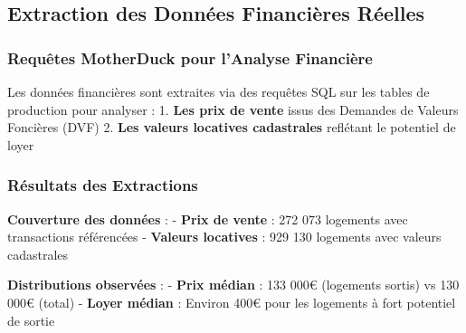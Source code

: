\documentclass[11pt]{article}
\begin{document}
    \subsection{Extraction des Données Financières
Réelles}\label{extraction-des-donnuxe9es-financiuxe8res-ruxe9elles}

\subsubsection{Requêtes MotherDuck pour l'Analyse
Financière}\label{requuxeates-motherduck-pour-lanalyse-financiuxe8re}

Les données financières sont extraites via des requêtes SQL sur les
tables de production pour analyser : 1. \textbf{Les prix de vente} issus
des Demandes de Valeurs Foncières (DVF) 2. \textbf{Les valeurs locatives
cadastrales} reflétant le potentiel de loyer

\subsubsection{Résultats des
Extractions}\label{ruxe9sultats-des-extractions}

\textbf{Couverture des données} : - \textbf{Prix de vente} : 272 073
logements avec transactions référencées - \textbf{Valeurs locatives} :
929 130 logements avec valeurs cadastrales

\textbf{Distributions observées} : - \textbf{Prix médian} : 133 000€
(logements sortis) vs 130 000€ (total) - \textbf{Loyer médian} : Environ
400€ pour les logements à fort potentiel de sortie
\end{document}
